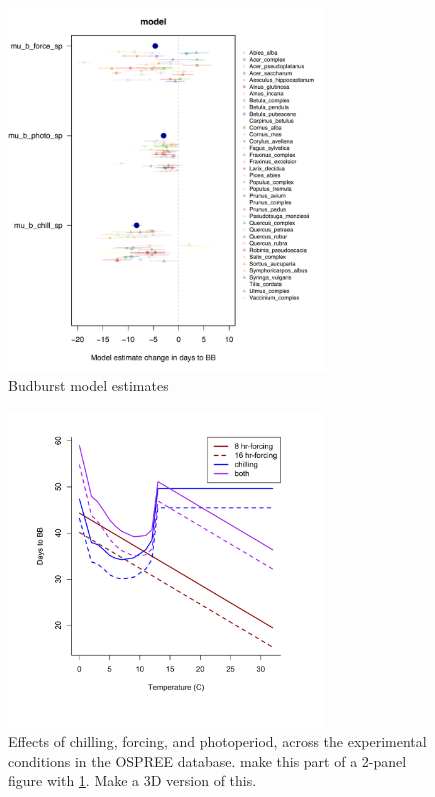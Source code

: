 \documentclass[11pt,letter]{article}
\begin{document}
\newpage

\begin{figure}[h!]
\centering
\noindent \includegraphics[width=0.75\textwidth]{..//..//analyses/bb_analysis/figures/muplotmodelspcom_expramp_fp_chillports.pdf}
\caption{Budburst model estimates}
\label{fig:mu}
\end{figure}

\begin{figure}[h!]
\centering
\noindent \includegraphics[width=0.75\textwidth]{..//..//analyses/bb_analysis/figures/expcondi_forecastplot.pdf}
\caption{Effects of chilling, forcing, and photoperiod, across the experimental conditions in the OSPREE database. make this part of a 2-panel figure with \ref{fig:mu}. Make a 3D version of this.}
\label{fig:apc}
\end{figure}
\end{document}
